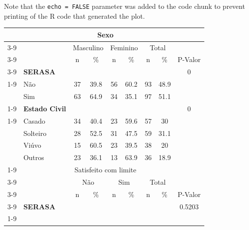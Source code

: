 \documentclass[]{article}
\begin{document}
Note that the \texttt{echo\ =\ FALSE} parameter was added to the code
chunk to prevent printing of the R code that generated the plot.

\begin{table}[t]
    \centering
        \begin{tabular}{c c c c c c c c c}
            \toprule
            \midrule
                & & \multicolumn{4}{c}{Sexo}\\ \cmidrule{3-9}
                && \multicolumn{2}{c}{Masculino} & \multicolumn{2}{c}{Feminino} & \multicolumn{2}{c}{Total} \\ \cmidrule{3-9}
                && n & \% & n & \% & n & \% & P-Valor \\ \cmidrule{3-9}
                \multicolumn{1}{c}{\multirow{5}{*}}   &
                \multicolumn{1}{l}{\textbf{SERASA}} &  &  &  & & &  & 0 \\ \cmidrule{1-9}
                \multicolumn{1}{c}{}    &
                \multicolumn{1}{l}{Não} & 37 & 39.8 & 56 & 60.2 & 93 & 48.9 &  \\
                \multicolumn{1}{c}{}    &
                \multicolumn{1}{l}{Sim}& 63 & 64.9 & 34 & 35.1 & 97 & 51.1  \\ \cmidrule{1-9} &
                \multicolumn{1}{l}{\textbf{Estado Civil}} &  &  &  & & &  & 0 \\ \cmidrule{1-9}                
                \multicolumn{1}{c}{}    &
                \multicolumn{1}{l}{Casado} & 34 & 40.4 & 23 & 59.6 & 57 & 30 &  \\
                \multicolumn{1}{c}{}    &   
                \multicolumn{1}{l}{Solteiro} & 28 & 52.5 & 31 & 47.5 & 59 & 31.1 &  \\
                \multicolumn{1}{c}{}    &
                \multicolumn{1}{l}{Viúvo} & 15 & 60.5 & 23 & 39.5 & 38 & 20   \\
                \multicolumn{1}{c}{}    &
                \multicolumn{1}{l}{Outros} & 23 & 36.1 & 13 & 63.9& 36 & 18.9   \\ \cmidrule{1-9}             
                & & \multicolumn{4}{c}{Satisfeito com limite}\\ \cmidrule{3-9}
                && \multicolumn{2}{c}{Não} & \multicolumn{2}{c}{Sim} & \multicolumn{2}{c}{Total}  \\ \cmidrule{3-9}
                && n & \% & n & \% & n & \% & P-Valor \\ \cmidrule{3-9}
                \multicolumn{1}{c}{\multirow{5}{*}}   &
                \multicolumn{1}{l}{\textbf{SERASA}} &  &  &  & & &  & 0.5203 \\ \cmidrule{1-9}

\end{tabular}
\end{table}
\end{document}
